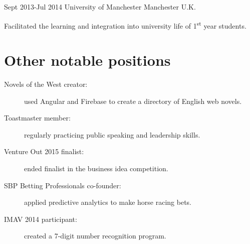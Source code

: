 \documentclass[10pt]{CurriculumVitae}
\begin{document}
      {Sept 2013-Jul 2014}
      {University of Manchester}
      {Manchester}
      {U.K.}
      {
         \item Facilitated the learning and integration into university life of 1\textsuperscript{st} year students.
      }


  \section{Other notable positions}
    \begin{description}
      \item[Novels of the West creator:] used Angular and Firebase to create a directory of English web novels.
      \item[Toastmaster member:] regularly practicing public speaking and leadership skills.
      \item[Venture Out 2015 finalist:] ended finalist in the business idea competition.
      \item[SBP Betting Professionals co-founder:] applied predictive analytics to make horse racing bets.
      \item[IMAV 2014 participant:] created a 7-digit number recognition program.
    \end{description}
\end{document}
